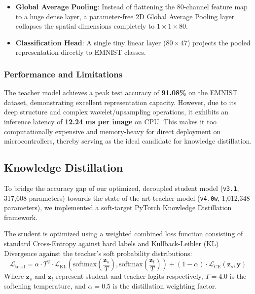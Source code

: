 \documentclass[12pt,a4paper]{article}
\begin{document}
\begin{itemize}
\begin{itemize}
              \item Batch Normalization and a residual connection are applied: $\mathbf{X}_{\text{out}} = \mathbf{X} + \text{BN}(\text{Conv}_{\text{dw}}(\mathbf{X}_{\text{proj}}))$.
          \end{itemize}
    \item \textbf{Global Average Pooling}: Instead of flattening the 80-channel feature map to a huge dense layer, a parameter-free 2D Global Average Pooling layer collapses the spatial dimensions completely to $1 \times 1 \times 80$.
    \item \textbf{Classification Head}: A single tiny linear layer ($80 \times 47$) projects the pooled representation directly to EMNIST classes.
\end{itemize}

\subsubsection{Performance and Limitations}
The teacher model achieves a peak test accuracy of \textbf{91.08\%} on the EMNIST dataset, demonstrating excellent representation capacity. However, due to its deep structure and complex wavelet/upsampling operations, it exhibits an inference latency of \textbf{12.24 ms per image} on CPU. This makes it too computationally expensive and memory-heavy for direct deployment on microcontrollers, thereby serving as the ideal candidate for knowledge distillation.

\subsection{Knowledge Distillation}
To bridge the accuracy gap of our optimized, decoupled student model (\texttt{v3.1}, 317,608 parameters) towards the state-of-the-art teacher model (\texttt{v4.0w}, 1,012,348 parameters), we implemented a soft-target PyTorch Knowledge Distillation framework.

The student is optimized using a weighted combined loss function consisting of standard Cross-Entropy against hard labels and Kullback-Leibler (KL) Divergence against the teacher's soft probability distributions:
\begin{equation}
    \mathcal{L}_{\text{total}} = \alpha \cdot T^2 \cdot \mathcal{L}_{\text{KL}}\left( \text{softmax}\left(\frac{\mathbf{z}_s}{T}\right), \text{softmax}\left(\frac{\mathbf{z}_t}{T}\right) \right) + (1 - \alpha) \cdot \mathcal{L}_{\text{CE}}(\mathbf{z}_s, \mathbf{y})
\end{equation}
Where $\mathbf{z}_s$ and $\mathbf{z}_t$ represent student and teacher logits respectively, $T = 4.0$ is the softening temperature, and $\alpha = 0.5$ is the distillation weighting factor.
\end{document}
